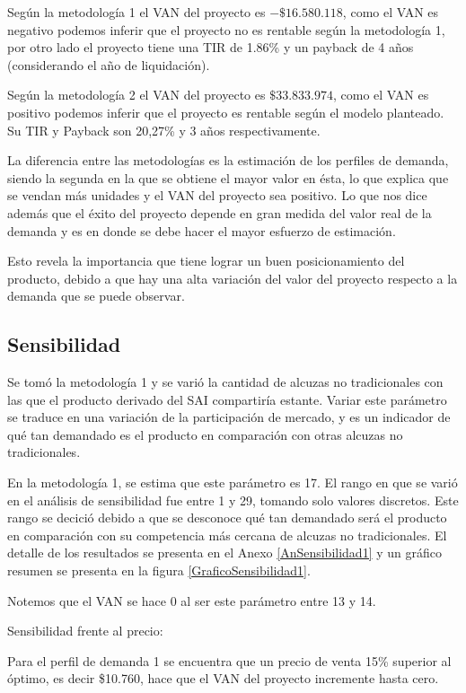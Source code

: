 Según la metodología 1 el VAN del proyecto es $-\$16.580.118$, como el VAN es negativo podemos inferir que el proyecto no es rentable según la metodología 1, por otro lado el proyecto tiene una TIR de 1.86\% y un payback de 4 años (considerando el año de liquidación).

Según la metodología 2 el VAN del proyecto es $\$33.833.974$, como el VAN es positivo podemos inferir que el proyecto es rentable según el modelo planteado. Su TIR y Payback son 20,27\% y 3 años respectivamente.

La diferencia entre las metodologías es la estimación de los perfiles de demanda, siendo la segunda en la que se obtiene el mayor valor en ésta, lo que explica que se vendan más unidades y el VAN del proyecto sea positivo. Lo que nos dice además que el éxito del proyecto depende en gran medida del valor real de la demanda y es en donde se debe hacer el mayor esfuerzo de estimación.

Esto revela la importancia que tiene lograr un buen posicionamiento del producto, debido a que hay una alta variación del valor del proyecto respecto a la demanda que se puede observar.

\subsection{Sensibilidad}

Se tomó la metodología 1 y se varió la cantidad de alcuzas no tradicionales con las que el producto derivado del SAI compartiría estante. Variar este parámetro se traduce en una variación de la participación de mercado, y es un indicador de qué tan demandado es el producto en comparación con otras alcuzas no tradicionales.

En la metodología 1, se estima que este parámetro es 17. El rango en que se varió en el análisis de sensibilidad fue entre 1 y 29, tomando solo valores discretos. Este rango se decició debido a que se desconoce qué tan demandado será el producto en comparación con su competencia más cercana de alcuzas no tradicionales. El detalle de los resultados se presenta en el Anexo \ref{AnSensibilidad1} y un gráfico resumen se presenta en la figura \ref{GraficoSensibilidad1}.

Notemos que el VAN se hace 0 al ser este parámetro entre 13 y 14.


Sensibilidad frente al precio:

Para el perfil de demanda 1 se encuentra que un precio de venta 15\% superior al óptimo, es decir \$10.760, hace que el VAN del proyecto incremente hasta cero.


